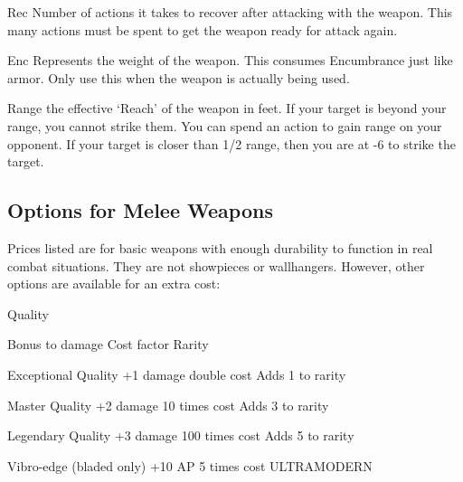 \documentclass[twoside]{book}
\begin{document}
            
                Rec   Number of actions it
                takes to recover after attacking with the weapon. This
                many actions must be spent to get the weapon ready for
                attack again.
              
            
                Enc   Represents the weight of
                the weapon. This consumes Encumbrance just like armor.
                Only use this when the weapon is actually being used.
              
            
                Range   the effective
                `Reach' of the weapon in feet. If your target
                is beyond your range, you cannot strike them. You can
                spend an action to gain range on your opponent. If your
                target is closer than 1/2 range, then you are at -6 to
                strike the target.
              
          
\subsection{Options for Melee Weapons}
      Prices listed are for basic weapons with enough
               durability to function in real combat situations. They are
               not showpieces or wallhangers. However, other options are
               available for an extra cost:   
                
                  
                     Quality
                     
                   Bonus to damage   
                   Cost factor   
                   Rarity   
                  
                  
                  
                   Exceptional Quality   
                   +1 damage   
                   double cost 
                   Adds 1 to rarity   
                  
                  
                   Master Quality 
                   +2 damage 
                   10 times cost 
                   Adds 3 to rarity   
                  
                  
                   Legendary Quality 
                   +3 damage 
                   100 times cost 
                   Adds 5 to rarity   
                  
                  
                   Vibro-edge (bladed only) 
                   +10 AP 
                   5 times cost 
                   ULTRAMODERN   
                  
\end{document}
